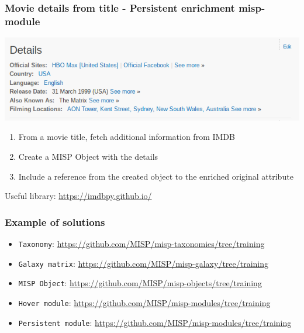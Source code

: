 \begin{frame}
    \frametitle{Movie details from title - Persistent enrichment misp-module}
    \begin{center}
        \includegraphics[width=0.85\linewidth]{pics/movie-details2}
    \end{center}
    \begin{enumerate}
        \item From a movie title, fetch additional information from IMDB
        \item Create a MISP Object with the details
        \item Include a reference from the created object to the enriched original attribute
    \end{enumerate}
    \vspace{1em}
    Useful library: \url{https://imdbpy.github.io/}
\end{frame}

\begin{frame}
    \frametitle{Example of solutions}
    \begin{itemize}
        \item \texttt{Taxonomy}: {\tiny \url{https://github.com/MISP/misp-taxonomies/tree/training}}
        \item \texttt{Galaxy matrix}: {\tiny \url{https://github.com/MISP/misp-galaxy/tree/training}}
        \item \texttt{MISP Object}: {\tiny \url{https://github.com/MISP/misp-objects/tree/training}}
        \item \texttt{Hover module}: {\tiny \url{https://github.com/MISP/misp-modules/tree/training}}
        \item \texttt{Persistent module}: {\tiny \url{https://github.com/MISP/misp-modules/tree/training}}
    \end{itemize}
\end{frame}
